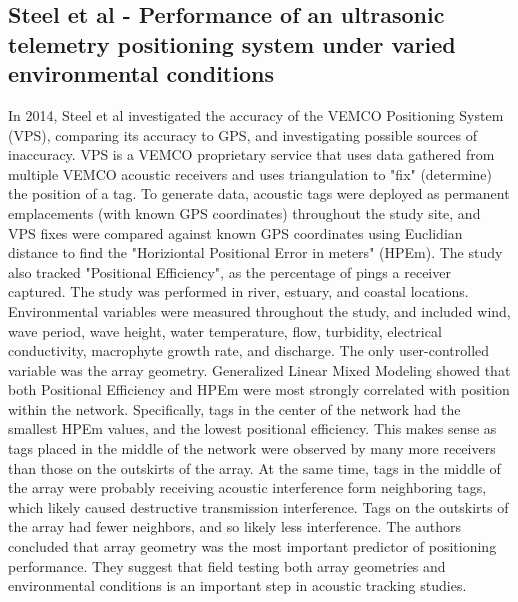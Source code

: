 \subsection {Steel et al - Performance of an ultrasonic telemetry positioning system under varied environmental conditions}

In 2014, Steel et al investigated the accuracy of the VEMCO Positioning System (VPS), comparing its accuracy to GPS, and investigating possible sources of inaccuracy.  VPS is a VEMCO proprietary service that uses data gathered from multiple VEMCO acoustic receivers and uses triangulation to "fix" (determine) the position of a tag.  To generate data, acoustic tags were deployed as permanent emplacements (with known GPS coordinates) throughout the study site, and VPS fixes were compared against known GPS coordinates using Euclidian distance to find the "Horiziontal Positional Error in meters" (HPEm).  The study also tracked "Positional Efficiency", as the percentage of pings a receiver captured.  The study was performed in river, estuary, and coastal locations.  Environmental variables were measured throughout the study, and included wind, wave period, wave height, water temperature, flow, turbidity, electrical conductivity, macrophyte growth rate, and discharge.  The only user-controlled variable was the array geometry.  Generalized Linear Mixed Modeling showed that both Positional Efficiency and HPEm were most strongly correlated with position within the network.  Specifically, tags in the center of the network had the smallest HPEm values, and the lowest positional efficiency.  This makes sense as tags placed in the middle of the network were observed by many more receivers than those on the outskirts of the array.  At the same time, tags in the middle of the array were probably receiving acoustic interference form neighboring tags, which likely caused destructive transmission interference.  Tags on the outskirts of the array had fewer neighbors, and so likely less interference.  The authors concluded that array geometry was the most important predictor of positioning performance. They suggest that field testing both array geometries and environmental conditions is an important step in acoustic tracking studies.



